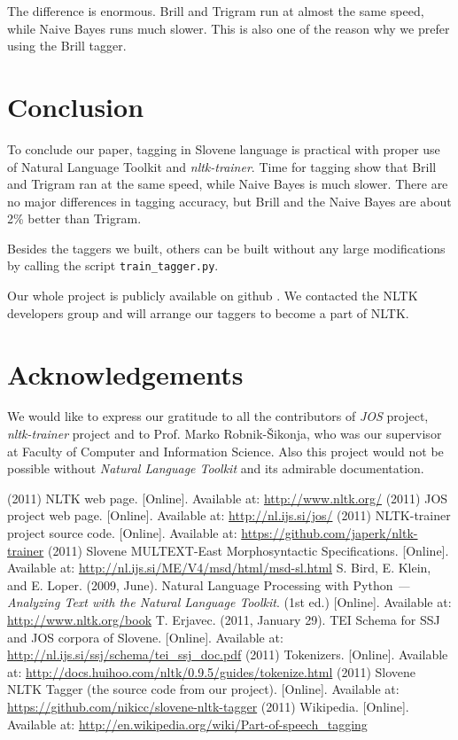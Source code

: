 \documentclass[10pt, conference, compsocconf]{IEEEtran}
\begin{document}
The difference is enormous. Brill and Trigram run at almost the same speed, while Naive Bayes runs much slower. This is also one of the reason why we prefer using the Brill tagger. 

\section{Conclusion} %
To conclude our paper, tagging in Slovene language is practical with proper use of Natural Language Toolkit and \textit{nltk-trainer}. Time for tagging show that Brill and Trigram ran at the same speed, while Naive Bayes is much slower. There are no major differences in tagging accuracy, but Brill and the Naive Bayes are about 2\% better than Trigram.
\par
Besides the taggers we built, others can be built without any large modifications by calling the script \texttt{train\_tagger.py}.
\par
Our whole project is publicly available on github \cite{CODE}. We contacted the NLTK developers group and will arrange our taggers to become a part of NLTK.

\section*{Acknowledgements} %
We would like to express our gratitude to all the contributors of \textit{JOS} \cite{JOS} project, \textit{nltk-trainer} \cite{nltk-trainer} project and to Prof. Marko Robnik-Šikonja, who was our supervisor at Faculty of Computer and Information Science. Also this project would not be possible without \textit{Natural Language Toolkit} \cite{nltk} and its admirable documentation.

\begin{thebibliography}{99}
 (2011) NLTK web page. [Online]. Available at: \url{http://www.nltk.org/}
 (2011) JOS project web page. [Online]. Available at: \url{http://nl.ijs.si/jos/}
 (2011) NLTK-trainer project source code. [Online]. Available at: \url{https://github.com/japerk/nltk-trainer}
 (2011) Slovene MULTEXT-East Morphosyntactic Specifications. [Online]. Available at: \url{http://nl.ijs.si/ME/V4/msd/html/msd-sl.html}
 S. Bird, E. Klein, and E. Loper. (2009, June). Natural Language Processing with Python \textit{--- Analyzing Text with the Natural Language Toolkit}. (1st ed.) [Online]. Available at: \url{http://www.nltk.org/book}
 T. Erjavec. (2011, January 29). TEI Schema for SSJ and JOS corpora of Slovene. [Online].
Available at: \url{http://nl.ijs.si/ssj/schema/tei_ssj_doc.pdf}
 (2011) Tokenizers. [Online]. Available at: \url{http://docs.huihoo.com/nltk/0.9.5/guides/tokenize.html}
 (2011) Slovene NLTK Tagger (the source code from our project). [Online]. Available at: \url{https://github.com/nikicc/slovene-nltk-tagger}
 (2011) Wikipedia. [Online]. Available at: \url{http://en.wikipedia.org/wiki/Part-of-speech_tagging}
\end{thebibliography}
\end{document}
